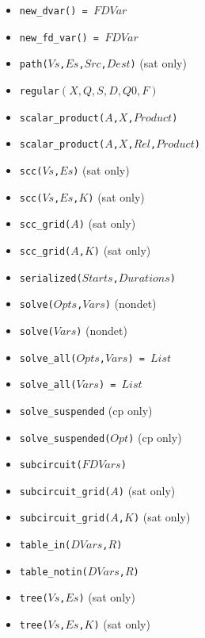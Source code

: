 \documentclass[10pt]{article}
\begin{document}
\begin{multicols}{2}
\begin{scriptsize}
\begin{itemize}
\item \texttt{new\_dvar() = $FDVar$}
\item \texttt{new\_fd\_var() = $FDVar$}
\item \texttt{path($Vs$,$Es$,$Src$,$Dest$)} (sat only)    
\item \texttt{regular$(X,Q,S,D,Q0,F)$}
\item \texttt{scalar\_product($A$,$X$,$Product$)} 
\item \texttt{scalar\_product($A$,$X$,$Rel$,$Product$)}
\item \texttt{scc($Vs$,$Es$)} (sat only) 
\item \texttt{scc($Vs$,$Es$,$K$)} (sat only)
\item \texttt{scc\_grid($A$)} (sat only) 
\item \texttt{scc\_grid($A$,$K$)} (sat only) 
\item \texttt{serialized($Starts$,$Durations$)}
\item \texttt{solve($Opts$,$Vars$)} (nondet)
\item \texttt{solve($Vars$)} (nondet)
\item \texttt{solve\_all($Opts$,$Vars$) = $List$}
\item \texttt{solve\_all($Vars$) = $List$}
\item \texttt{solve\_suspended} (cp only)
\item \texttt{solve\_suspended($Opt$)} (cp only)
\item \texttt{subcircuit($FDVars$)}
\item \texttt{subcircuit\_grid($A$)} (sat only)
\item \texttt{subcircuit\_grid($A$,$K$)} (sat only) 
\item \texttt{table\_in($DVars$,$R$)}
\item \texttt{table\_notin($DVars$,$R$)}
\item \texttt{tree($Vs$,$Es$)} (sat only) 
\item \texttt{tree($Vs$,$Es$,$K$)} (sat only)
\end{itemize}
\end{scriptsize}

\end{multicols}
\end{document}
